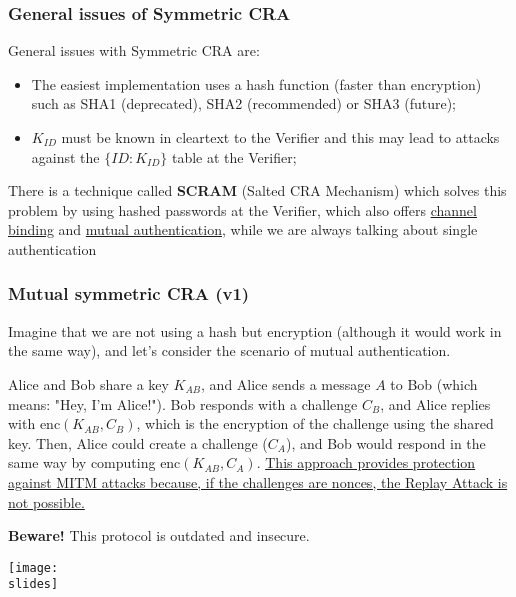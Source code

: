 \subsubsection*{General issues of Symmetric CRA}
General issues with Symmetric CRA are:
\begin{itemize}
  \item The easiest implementation uses a hash function (faster than encryption) such as SHA1 (deprecated),
        SHA2 (recommended) or SHA3 (future);
  \item \(K_{ID}\) must be known in cleartext to the Verifier and this may lead to attacks against the \( \{ID: K_{ID}\} \) table at the Verifier;
\end{itemize}
There is a technique called \textbf{SCRAM} (Salted CRA Mechanism) which solves this problem by using hashed
passwords at the Verifier, which also offers \underline{channel binding} and \underline{mutual authentication}, while we are always talking about single authentication


\subsubsection{Mutual symmetric CRA (v1)}
\noindent
\begin{minipage}{0.4\textwidth}
  Imagine that we are not using a hash but encryption (although it would work in the same way), and let's consider the scenario of mutual authentication.

  Alice and Bob share a key \(K_{AB}\), and Alice sends a message \(A\) to Bob (which means: "Hey, I'm Alice!").
  Bob responds with a challenge \(C_B\),
  and Alice replies with \(\text{enc}(K_{AB}, C_B)\), which is the encryption of the challenge using the shared key.
  Then, Alice could create a challenge (\(C_A\)), and Bob would respond in the same way by computing \(\text{enc}(K_{AB}, C_A)\).
  \ul{This approach provides protection against MITM attacks because, if the challenges are nonces, the Replay Attack is not possible.}

  \textbf{Beware!} This protocol is outdated and insecure.
\end{minipage}
\hspace{0.05\textwidth}
\begin{minipage}{0.5\textwidth}
  \centering
  \texttt{[image: \\slides]}
\end{minipage}

